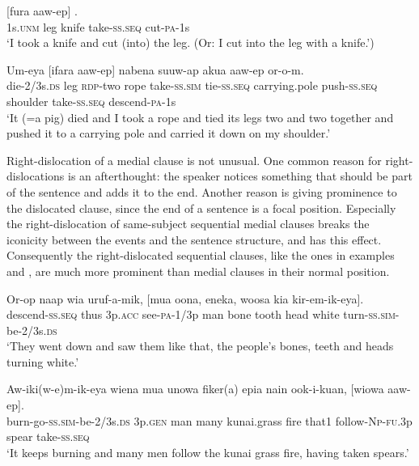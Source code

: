 \ea%
\label{ex:8:x1467}
\gll {}    [fura  aaw-ep]  . \\
1s.\textsc{unm} leg  knife  take-\textsc{ss}.\textsc{seq} cut-\textsc{pa}-1s\\
\glt`I took a knife and cut (into) the leg. (Or: I cut into the leg with a knife.')
\z


\ea%
\label{ex:8:x1468}
\gll Um-eya      [ifara  aaw-ep]   nabena  suuw-ap  akua  aaw-ep  or-o-m.\\
die-2/3s.\textsc{ds} leg \textsc{rdp}-two rope take-\textsc{ss}.\textsc{sim} tie-\textsc{ss}.\textsc{seq} carrying.pole push-\textsc{ss}.\textsc{seq} shoulder take-\textsc{ss}.\textsc{seq} descend-\textsc{pa}-1s\\
\glt`It (=a pig) died and I took a rope and tied its legs two and two together and pushed it to a carrying pole and carried it down on my shoulder.'
\z


Right-dislocation of a medial clause is not unusual. One common reason for right-dislocations is an afterthought: the speaker notices something that should be part of the sentence and adds it to the end. Another reason is giving prominence to the dislocated clause, since the end of a sentence is a focal position. Especially the right-dislocation of same-subject sequential medial clauses breaks the iconicity between the events and the sentence structure, and has this effect. Consequently the right-dislocated  sequential clauses, like the ones in examples  and , are much more prominent than medial clauses in their normal position.

\ea%
\label{ex:8:x1471}
\gll Or-op  naap  wia  uruf-a-mik,  [mua  oona,  eneka,  woosa kia  kir-em-ik-eya]. \\
descend-\textsc{ss}.\textsc{seq} thus 3p.\textsc{acc} see-\textsc{pa}-1/3p man  bone  tooth  head white  turn-\textsc{ss}.\textsc{sim}-be-2/3s.\textsc{ds}\\
\glt`They went down and saw them like that, the people's bones, teeth and heads turning white.'
\z


\ea%
\label{ex:8:x1469}
\gll Aw-iki(w-e)m-ik-eya  wiena  mua  unowa  fiker(a)  epia nain  ook-i-kuan,  [wiowa  aaw-ep].\\
burn-go-\textsc{ss}.\textsc{sim}-be-2/3s.\textsc{ds} 3p.\textsc{gen} man  many  kunai.grass  fire that1 follow-\textsc{Np}-\textsc{fu}.3p  spear  take-\textsc{ss}.\textsc{seq}\\
\glt`It keeps burning and many men follow the kunai grass fire, having taken spears.'
\z


